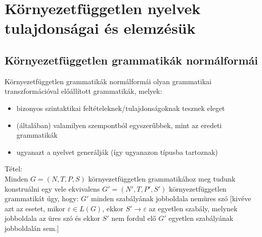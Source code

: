 \documentclass[margin=0px]{article}
\begin{document}
	\section{Környezetfüggetlen nyelvek tulajdonságai és elemzésük}
		\subsection{Környezetfüggetlen grammatikák normálformái}
			Környezetfüggetlen grammatikák normálformái olyan grammatikai transzformációval előállított  grammatikák, melyek:
				\begin{itemize}
					\item bizonyos szintaktikai feltételeknek/tulajdonságoknak tesznek eleget
					\item (általában) valamilyen szempontból egyszerűbbek, mint az eredeti grammatikák
					\item ugyanazt a nyelvet generálják (így ugyanazon típusba tartoznak)
				\end{itemize}
				Tétel:\\
				Minden $G = (N, T, P, S)$ környezetfüggetlen grammatikához meg tudunk konstruálni egy vele ekvivalens $G' = (N', T, P', S')$ környezetfüggetlen grammatikát úgy, hogy: $G'$ minden szabályának jobboldala nemüres szó [kivéve azt az esetet, mikor $\varepsilon \in L(G)$, ekkor $S' \rightarrow \varepsilon$ az egyetlen szabály, melynek jobboldala az üres szó és ekkor $S'$ nem fordul elő $G'$ egyetlen szabályának jobboldalán sem.]
\end{document}
